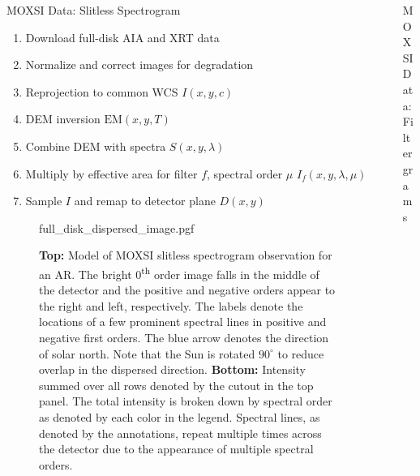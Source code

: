 \documentclass[final]{beamer}
\newlength{\sepwidth}
\newlength{\colwidth}
\newcommand{\separatorcolumn}{\begin{column}{\sepwidth}\end{column}}
\begin{document}
\begin{frame}[t]
\begin{columns}[t]
\begin{column}{\colwidth}
\begin{block}{MOXSI Data: Slitless Spectrogram}
    \begin{multicols}{2}
      \begin{enumerate}
        \item Download full-disk AIA and XRT data
        \item Normalize and correct images for degradation
        \item Reprojection to common WCS \rightarrow $I(x,y,c)$
        \item DEM inversion \citep{hannah_differential_2012} \rightarrow $\mathrm{EM}(x,y,T)$
        \item Combine DEM with spectra \rightarrow $S(x,y,\lambda)$
        \item Multiply by effective area for filter $f$, spectral order $\mu$ \rightarrow $I_f(x,y,\lambda,\mu)$
        \item Sample $I$ and remap to detector plane \rightarrow $D(x,y)$
      \end{enumerate}
    \end{multicols}

    \begin{figure}
      \centering
      {full_disk_dispersed_image.pgf}
      \caption{\textbf{Top:} Model of MOXSI slitless spectrogram observation for an AR. The bright 0\textsuperscript{th} order image falls in the middle of the detector and the positive and negative orders appear to the right and left, respectively. The labels denote the locations of a few prominent spectral lines in positive and negative first orders. The blue arrow denotes the direction of solar north. Note that the Sun is rotated $90^\circ$ to reduce overlap in the dispersed direction. \textbf{Bottom:} Intensity summed over all rows denoted by the cutout in the top panel. The total intensity is broken down by spectral order as denoted by each color in the legend. Spectral lines, as denoted by the annotations, repeat multiple times across the detector due to the appearance of multiple spectral orders.}
      \label{fig:full_disk_overlappograms}
    \end{figure}

  \end{block}

\end{column}

\separatorcolumn

\begin{column}{\colwidth}

  \begin{block}{MOXSI Data: Filtergrams}


\end{block}
\end{column}
\end{columns}
\end{frame}
\end{document}
